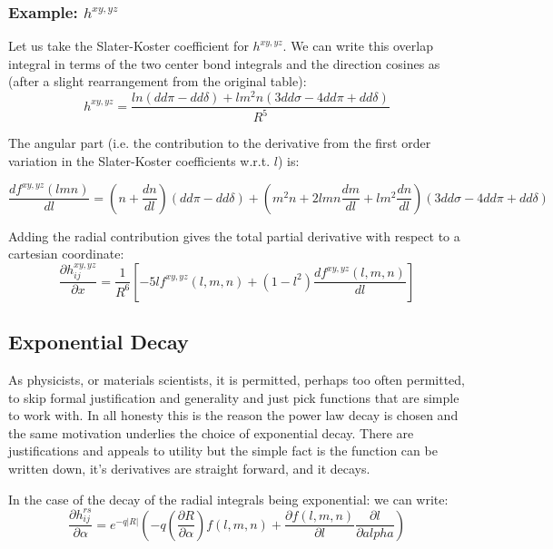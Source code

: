 \subsubsection{Example: $h^{xy,yz}$ }
Let us take the Slater-Koster coefficient for $h^{xy,yz}$. 
We can write this overlap integral in terms of the two center bond integrals 
and the direction cosines as (after a slight rearrangement from the original table):
% 
\begin{equation}
h^{xy,yz} = \frac{ln(dd\pi-dd\delta) + lm^{2}n (3dd\sigma-4dd\pi+dd\delta)}{R^5}
\end{equation}
%

The angular part (i.e. the contribution to the derivative from the first order variation in 
the Slater-Koster coefficients w.r.t. $l$) is:

\begin{equation}
\frac{d{f^{xy,yz}(lmn)}}{dl} = (n + \frac{dn}{dl})(dd\pi-dd\delta) 
                                                  + (m^{2}n +2lmn\frac{dm}{dl}+lm^{2}\frac{dn}{dl})(3dd\sigma-4dd\pi+dd\delta)
\end{equation}

Adding the radial contribution gives the total partial derivative with respect to a cartesian coordinate:
%
\begin{equation}
\frac{\partial h^{xy,yz}_{ij}}{\partial x} =  \frac{1}{R^{6}}[-5lf^{xy,yz}(l,m,n) + (1-l^{2})\frac{df^{xy,yz}(l,m,n)}{dl}]
\end{equation}
%

\subsection{Exponential Decay}
As physicists, or materials scientists, it is permitted, perhaps too often permitted, to skip formal
justification and generality and just pick functions that are simple to work with. In all honesty this
is the reason the power law decay is chosen and the same motivation underlies the choice of exponential
decay. There are justifications and appeals to utility but the simple fact is the function can be written
down, it's derivatives are straight forward, and it decays. 

In the case of the decay of the radial integrals being exponential:
we can write:
%
\begin{equation}
\frac{\partial h^{rs}_{ij}}{\partial \alpha} = e^{-q|R|}(-q(\frac{\partial R}{\partial \alpha})f(l,m,n) + 
\frac{\partial f(l,m,n)}{\partial l}\frac{\partial l}{\partial alpha})
\end{equation}





